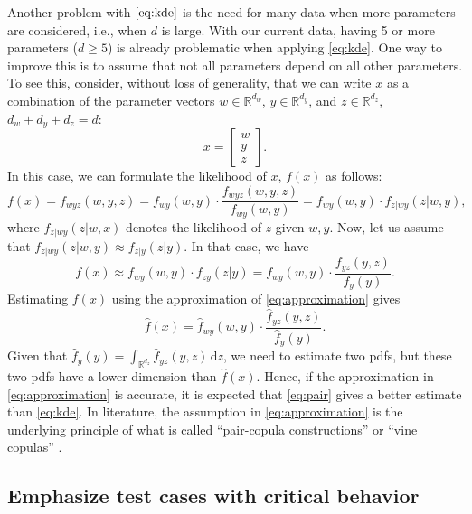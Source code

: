 \documentclass[10pt,final,a4paper,oneside,onecolumn]{article}
\newcommand{\ud}{\,\mathrm{d}}
\begin{document}
Another problem with $\cref{eq:kde}$ is the need for many data when more parameters are considered, i.e., when $d$ is large. With our current data, having 5 or more parameters ($d \geq 5$) is already problematic when applying \cref{eq:kde}. One way to improve this is to assume that not all parameters depend on all other parameters. To see this, consider, without loss of generality, that we can write $x$ as a combination of the parameter vectors $w\in\mathds{R}^{d_w}$, $y\in\mathds{R}^{d_y}$, and $z\in\mathds{R}^{d_z}$, $d_w+d_y+d_z=d$:
\begin{equation}
	x = \begin{bmatrix}
	w \\ y \\ z
	\end{bmatrix}.
\end{equation}
In this case, we can formulate the likelihood of $x$, $f(x)$ as follows:
\begin{equation}
	f(x) = f_{wyz}(w,y,z) = f_{wy}(w,y) \cdot \frac{f_{wyz}(w,y,z)}{f_{wy}(w,y)} = f_{wy}(w,y) \cdot f_{z|wy}(z | w, y),
\end{equation} 
where $f_{z|wy}(z|w,x)$ denotes the likelihood of $z$ given $w,y$. Now, let us assume that $f_{z|wy}(z|w,y) \approx f_{z|y}(z|y)$. In that case, we have
\begin{equation} \label{eq:approximation}
	f(x) \approx f_{wy}(w,y) \cdot f_{zy}(z|y) = f_{wy}(w,y) \cdot \frac{f_{yz}(y,z)}{f_y(y)}.
\end{equation}
Estimating $f(x)$ using the approximation of \cref{eq:approximation} gives
\begin{equation} \label{eq:pair}
	\hat{f}(x) = \hat{f}_{wy}(w,y) \cdot \frac{\hat{f}_{yz}(y,z)}{\hat{f}_y(y)}.
\end{equation}
Given that $\hat{f}_y(y) = \int_{\mathds{R}^{d_z}} \hat{f}_{yz}(y,z) \ud z$, we need to estimate two pdfs, but these two pdfs have a lower dimension than $\hat{f}(x)$. Hence, if the approximation in \cref{eq:approximation} is accurate, it is expected that \cref{eq:pair} gives a better estimate than \cref{eq:kde}.
In literature, the assumption in \cref{eq:approximation} is the underlying principle of what is called ``pair-copula constructions'' or ``vine copulas'' \autocite{aas2009paircopula, czado2010paircopula,  nagler2016evading}.



\subsection{Emphasize test cases with critical behavior}
\end{document}
